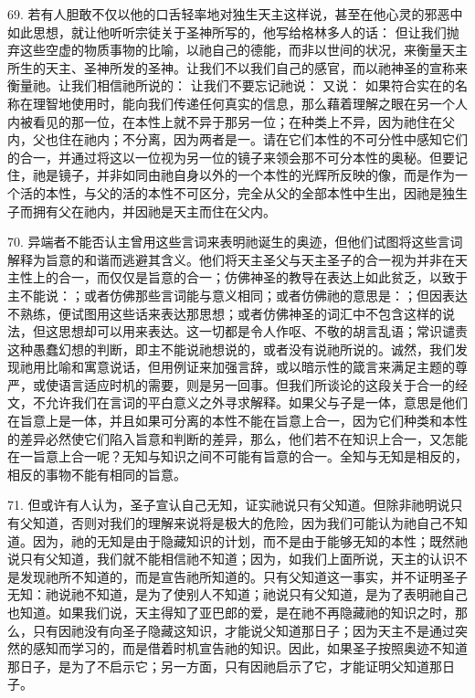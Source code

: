 69. 若有人胆敢不仅以他的口舌轻率地对独生天主这样说，甚至在他心灵的邪恶中如此思想，就让他听听宗徒关于圣神所写的，他写给格林多人的话： 但让我们抛弃这些空虚的物质事物的比喻，以祂自己的德能，而非以世间的状况，来衡量天主所生的天主、圣神所发的圣神。让我们不以我们自己的感官，而以祂神圣的宣称来衡量祂。让我们相信祂所说的： 让我们不要忘记祂说： 又说： 如果符合实在的名称在理智地使用时，能向我们传递任何真实的信息，那么藉着理解之眼在另一个人内被看见的那一位，在本性上就不异于那另一位；在种类上不异，因为祂住在父内，父也住在祂内；不分离，因为两者是一。请在它们本性的不可分性中感知它们的合一，并通过将这以一位视为另一位的镜子来领会那不可分本性的奥秘。但要记住，祂是镜子，并非如同由祂自身以外的一个本性的光辉所反映的像，而是作为一个活的本性，与父的活的本性不可区分，完全从父的全部本性中生出，因祂是独生子而拥有父在祂内，并因祂是天主而住在父内。\par

70. 异端者不能否认主曾用这些言词来表明祂诞生的奥迹，但他们试图将这些言词解释为旨意的和谐而逃避其含义。他们将天主圣父与天主圣子的合一视为并非在天主性上的合一，而仅仅是旨意的合一；仿佛神圣的教导在表达上如此贫乏，以致于主不能说：；或者仿佛那些言词能与意义相同；或者仿佛祂的意思是：；但因表达不熟练，便试图用这些话来表达那思想；或者仿佛神圣的词汇中不包含这样的说法，但这思想却可以用来表达。这一切都是令人作呕、不敬的胡言乱语；常识谴责这种愚蠢幻想的判断，即主不能说祂想说的，或者没有说祂所说的。诚然，我们发现祂用比喻和寓意说话，但用例证来加强言辞，或以暗示性的箴言来满足主题的尊严，或使语言适应时机的需要，则是另一回事。但我们所谈论的这段关于合一的经文，不允许我们在言词的平白意义之外寻求解释。如果父与子是一体，意思是他们在旨意上是一体，并且如果可分离的本性不能在旨意上合一，因为它们种类和本性的差异必然使它们陷入旨意和判断的差异，那么，他们若不在知识上合一，又怎能在一旨意上合一呢？无知与知识之间不可能有旨意的合一。全知与无知是相反的，相反的事物不能有相同的旨意。\par

71. 但或许有人认为，圣子宣认自己无知，证实祂说只有父知道。但除非祂明说只有父知道，否则对我们的理解来说将是极大的危险，因为我们可能认为祂自己不知道。因为，祂的无知是由于隐藏知识的计划，而不是由于能够无知的本性；既然祂说只有父知道，我们就不能相信祂不知道；因为，如我们上面所说，天主的认识不是发现祂所不知道的，而是宣告祂所知道的。只有父知道这一事实，并不证明圣子无知：祂说祂不知道，是为了使别人不知道；祂说只有父知道，是为了表明祂自己也知道。如果我们说，天主得知了亚巴郎的爱，是在祂不再隐藏祂的知识之时，那么，只有因祂没有向圣子隐藏这知识，才能说父知道那日子；因为天主不是通过突然的感知而学习的，而是借着时机宣告祂的知识。因此，如果圣子按照奥迹不知道那日子，是为了不启示它；另一方面，只有因祂启示了它，才能证明父知道那日子。\par

